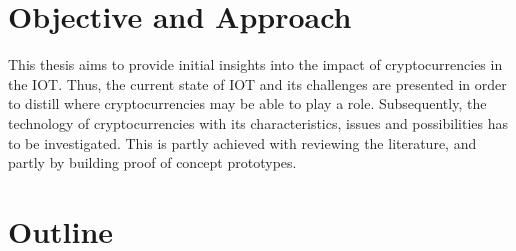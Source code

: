\section{Objective and Approach}
 
This thesis aims to provide initial insights into the impact of cryptocurrencies in the \ac{IOT}. Thus, the current state of \ac{IOT} and its challenges are presented in order to distill where cryptocurrencies may be able to play a role. Subsequently, the technology of cryptocurrencies with its characteristics, issues and possibilities has to be investigated. This is partly achieved with reviewing the literature, and partly by building proof of concept prototypes. 


\section{Outline}

